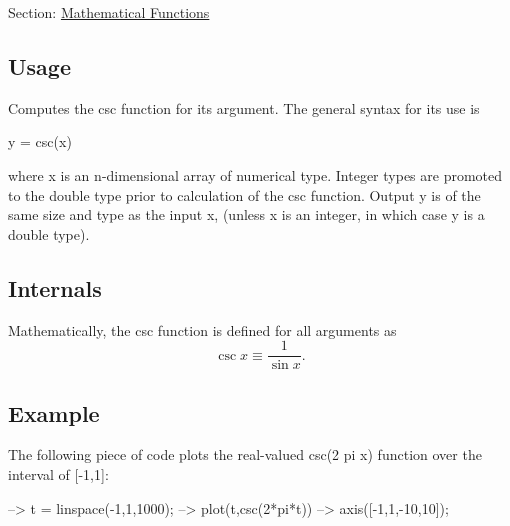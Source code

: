 Section\-: \hyperlink{sec_mathfunctions}{Mathematical Functions} \hypertarget{vtkwidgets_vtkxyplotwidget_Usage}{}\subsection{Usage}\label{vtkwidgets_vtkxyplotwidget_Usage}
Computes the {\ttfamily csc} function for its argument. The general syntax for its use is \begin{DoxyVerb}  y = csc(x)
\end{DoxyVerb}
 where {\ttfamily x} is an {\ttfamily n}-\/dimensional array of numerical type. Integer types are promoted to the {\ttfamily double} type prior to calculation of the {\ttfamily csc} function. Output {\ttfamily y} is of the same size and type as the input {\ttfamily x}, (unless {\ttfamily x} is an integer, in which case {\ttfamily y} is a {\ttfamily double} type). \hypertarget{transforms_svd_Function}{}\subsection{Internals}\label{transforms_svd_Function}
Mathematically, the {\ttfamily csc} function is defined for all arguments as \[ \csc x \equiv \frac{1}{\sin x}. \] \hypertarget{variables_struct_Example}{}\subsection{Example}\label{variables_struct_Example}
The following piece of code plots the real-\/valued {\ttfamily csc(2 pi x)} function over the interval of {\ttfamily \mbox{[}-\/1,1\mbox{]}}\-:


\begin{DoxyVerbInclude}
--> t = linspace(-1,1,1000);
--> plot(t,csc(2*pi*t))
--> axis([-1,1,-10,10]);
\end{DoxyVerbInclude}


